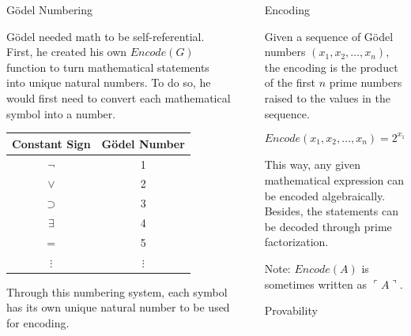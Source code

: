 \documentclass[final]{beamer} %
\newlength{\sepwidth}
\newlength{\colwidth}
\newcommand{\separatorcolumn}{\begin{column}{\sepwidth}\end{column}}
\begin{document}
\begin{frame}[t]
\begin{columns}[t]
\begin{column}{\colwidth}
\begin{block}{Gödel Numbering}

      Gödel needed math to be self-referential. First, he created his own $Encode(G)$ function to turn mathematical statements into unique natural numbers. To do so, he would first need to convert each mathematical symbol into a number.

    \begin{table}[h]
    \centering
    \begin{tabular}{c|c}
    \textbf{Constant Sign} & \textbf{Gödel Number} \\ \hline
    $\neg$ & 1 \\ 
    $\lor$ & 2 \\ 
    $\supset$ & 3 \\ 
    $\exists$ & 4 \\ 
    $=$ & 5 \\ 
    $\vdots$ & $\vdots$ \\ 
    \end{tabular}
    \end{table}

    Through this numbering system, each symbol has its own unique natural number to be used for encoding.
    
  \end{block}

\end{column}

\separatorcolumn %

\begin{column}{\colwidth}

  \begin{block}{Encoding}

    Given a sequence of Gödel numbers $(x_1, x_2, \dots, x_n)$, the encoding is the product of the first $n$ prime numbers raised to the values in the sequence.

    $$Encode(x_1, x_2, \dots, x_n) = 2^{x_1} \times 3^{x_2} \times \ldots \times p_n^{x_n}$$

    This way, any given mathematical expression can be encoded algebraically. Besides, the statements can be decoded through prime factorization.

    Note: $Encode(A)$ is sometimes written as $\ulcorner A \urcorner$.

  \end{block}

 \begin{block}{Provability}


\end{block}
\end{column}
\end{columns}
\end{frame}
\end{document}
